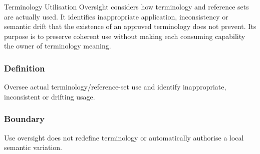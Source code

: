 Terminology Utilisation Oversight considers how terminology and reference sets are actually used. It identifies inappropriate application, inconsistency or semantic drift that the existence of an approved terminology does not prevent. Its purpose is to preserve coherent use without making each consuming capability the owner of terminology meaning.

\subsubsection*{Definition}

Oversee actual terminology/\allowbreak{}reference-set use and identify inappropriate, inconsistent or drifting usage.

\subsubsection*{Boundary}

Use oversight does not redefine terminology or automatically authorise a local semantic variation.


